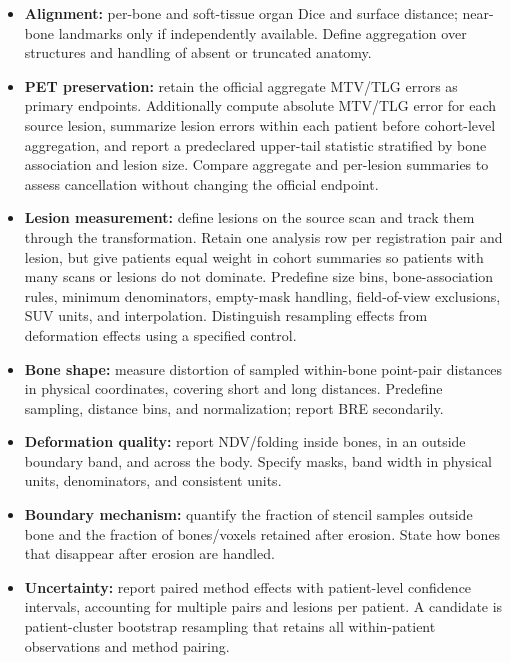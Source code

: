 \begin{journaladdition}
\begin{itemize}
  \item \textbf{Alignment:} per-bone and soft-tissue organ Dice and surface distance; near-bone landmarks only if independently available. Define aggregation over structures and handling of absent or truncated anatomy.
  \item \textbf{PET preservation:} retain the official aggregate MTV/TLG errors as primary endpoints. Additionally compute absolute MTV/TLG error for each source lesion, summarize lesion errors within each patient before cohort-level aggregation, and report a predeclared upper-tail statistic stratified by bone association and lesion size. Compare aggregate and per-lesion summaries to assess cancellation without changing the official endpoint.
  \item \textbf{Lesion measurement:} define lesions on the source scan and track them through the transformation. Retain one analysis row per registration pair and lesion, but give patients equal weight in cohort summaries so patients with many scans or lesions do not dominate. Predefine size bins, bone-association rules, minimum denominators, empty-mask handling, field-of-view exclusions, SUV units, and interpolation. Distinguish resampling effects from deformation effects using a specified control.
  \item \textbf{Bone shape:} measure distortion of sampled within-bone point-pair distances in physical coordinates, covering short and long distances. Predefine sampling, distance bins, and normalization; report BRE secondarily.
  \item \textbf{Deformation quality:} report NDV/folding inside bones, in an outside boundary band, and across the body. Specify masks, band width in physical units, denominators, and consistent units.
  \item \textbf{Boundary mechanism:} quantify the fraction of stencil samples outside bone and the fraction of bones/voxels retained after erosion. State how bones that disappear after erosion are handled.
  \item \textbf{Uncertainty:} report paired method effects with patient-level confidence intervals, accounting for multiple pairs and lesions per patient. A candidate is patient-cluster bootstrap resampling that retains all within-patient observations and method pairing.
\end{itemize}


\end{journaladdition}
